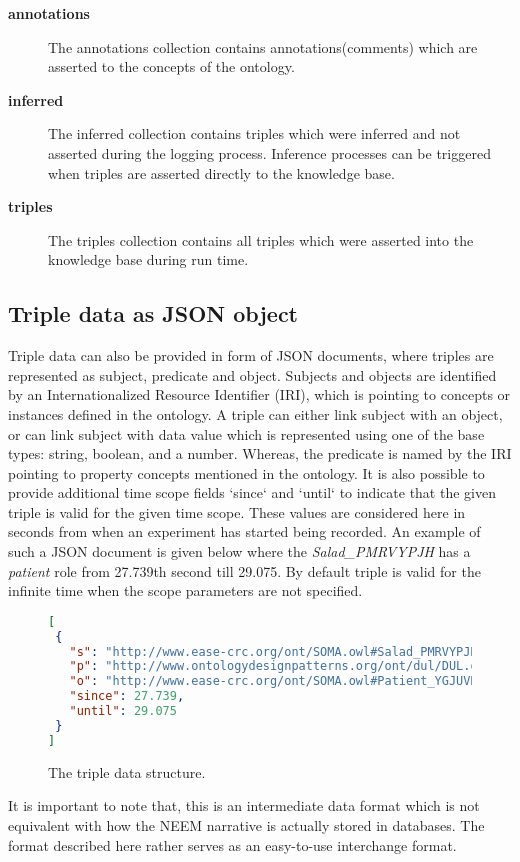 \begin{description}
	\item[\textbf{annotations}] The annotations collection contains annotations(comments) which are asserted to the concepts of the ontology.
	\item[\textbf{inferred}] The inferred collection contains triples which were inferred and not asserted during the logging process. Inference processes can be triggered when triples are asserted directly to the knowledge base.
	\item[\textbf{triples}] The triples collection contains all triples which were asserted into the knowledge base during run time.
\end{description}

\subsection{Triple data as JSON object}
	Triple data can also be provided in form of JSON documents, where triples are represented as subject, predicate and object. Subjects and objects are identified by an Internationalized Resource Identifier (IRI), which is pointing to concepts or instances defined in the \soma ontology. A triple can either link subject with an object, or can link subject with data value which is represented using one of the base types: string, boolean, and a number. Whereas, the predicate is named by the IRI pointing to property concepts mentioned in the \soma ontology. It is also possible to provide additional time scope fields `since` and `until` to indicate that the given triple is valid for the given time scope. These values are considered here in seconds from when an experiment has started being recorded. An example of such a JSON document is given below where the \emph{Salad\_PMRVYPJH} has a \emph{patient} role from 27.739th second till 29.075. By default triple is valid for the infinite time when the scope parameters are not specified. 
\def\arraystretch{1.1}%
\begin{figure}[htb]
\begin{lstlisting}[language=json,firstnumber=1]
[
 {
   "s": "http://www.ease-crc.org/ont/SOMA.owl#Salad_PMRVYPJH",
   "p": "http://www.ontologydesignpatterns.org/ont/dul/DUL.owl#hasRole",
   "o": "http://www.ease-crc.org/ont/SOMA.owl#Patient_YGJUVNDR",
   "since": 27.739,
   "until": 29.075
 }
]
\end{lstlisting}
\caption{The triple data structure.}
\label{fig:triple_data}
\end{figure}

It is important to note that, this is an intermediate data format which is not equivalent with how the NEEM narrative is actually stored in databases.
The format described here rather serves as an easy-to-use interchange format.



